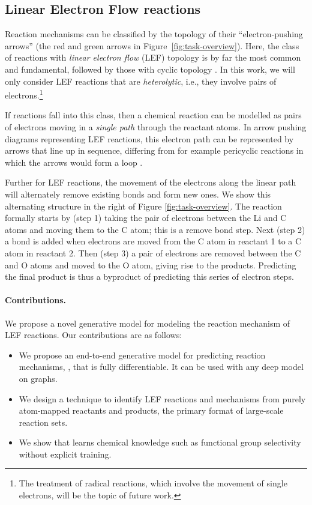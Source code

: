 \subsection{Linear Electron Flow reactions} \label{sect:LEF}
%


Reaction mechanisms can be classified by the topology of their ``electron-pushing arrows'' (the red and green arrows in Figure~\ref{fig:task-overview}). 
Here, the class of reactions with \emph{linear electron flow} (LEF) topology is by far the most common and fundamental, followed by those with cyclic topology \citep{herges1994coarctate}. 
In this work, we will only consider LEF reactions that are \emph{heterolytic}, i.e., they involve pairs of electrons.\footnote{The treatment of radical reactions, which involve the movement of single electrons, will be the topic of future work.}

If reactions fall into this class, then a chemical reaction can be modelled as pairs of electrons moving in a \emph{single path} through the reactant atoms. 
In arrow pushing diagrams representing LEF reactions, this electron path can be represented by arrows that line up in sequence, differing from for example pericyclic reactions in which the arrows would form a loop \citep{herges1994coarctate}.


Further for LEF reactions, the movement of the electrons along the linear path will alternately remove existing bonds and form new ones. 
We show this alternating structure in the right of Figure \ref{fig:task-overview}. 
The reaction formally starts by (step 1) taking the pair of electrons between the Li and C atoms and moving them to the C atom; this is a remove bond step. 
Next (step 2) a bond is added when electrons are moved from the C atom in reactant 1 to a C atom in reactant 2.
Then (step 3) a pair of electrons are removed between the C and O atoms and moved to the O atom, giving rise to the products. 
Predicting the final product is thus a byproduct of predicting this series of electron steps.


\paragraph{Contributions.} We propose a novel generative model for modeling the reaction mechanism of LEF reactions. Our contributions are as follows:
\begin{itemize}
\item We propose an end-to-end generative model for predicting reaction mechanisms, \ourModelR, that is fully differentiable. It can be used with any deep model on graphs.
\item We design a technique to identify LEF reactions and mechanisms from purely atom-mapped reactants and products, the primary format of large-scale reaction sets.
\item We show that \ourModelR learns chemical knowledge such as functional group selectivity without explicit training.
\end{itemize}


